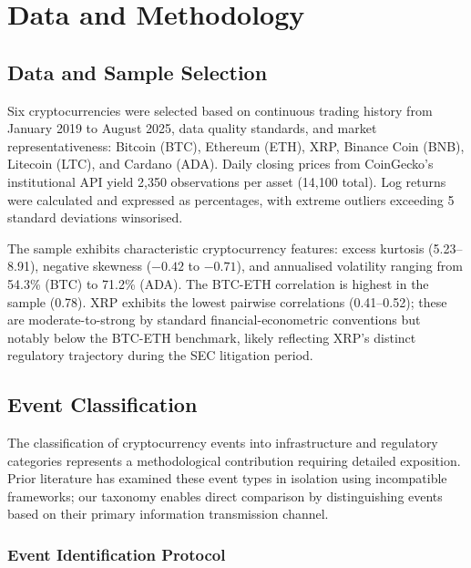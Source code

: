 \documentclass[pdflatex,sn-mathphys-num]{sn-jnl}
\theoremstyle{thmstyleone}
\theoremstyle{thmstyletwo}
\theoremstyle{thmstylethree}
\begin{document}

\section{Data and Methodology}\label{sec:methods}

\subsection{Data and Sample Selection}

Six cryptocurrencies were selected based on continuous trading history from January 2019 to August 2025, data quality standards, and market representativeness: Bitcoin (BTC), Ethereum (ETH), XRP, Binance Coin (BNB), Litecoin (LTC), and Cardano (ADA). Daily closing prices from CoinGecko's institutional API yield 2,350 observations per asset (14,100 total). Log returns were calculated and expressed as percentages, with extreme outliers exceeding 5 standard deviations winsorised.

The sample exhibits characteristic cryptocurrency features: excess kurtosis (5.23--8.91), negative skewness ($-0.42$ to $-0.71$), and annualised volatility ranging from 54.3\% (BTC) to 71.2\% (ADA). The BTC-ETH correlation is highest in the sample (0.78). XRP exhibits the lowest pairwise correlations (0.41--0.52); these are moderate-to-strong by standard financial-econometric conventions but notably below the BTC-ETH benchmark, likely reflecting XRP's distinct regulatory trajectory during the SEC litigation period.

\subsection{Event Classification}\label{sec:event_classification}

The classification of cryptocurrency events into infrastructure and regulatory categories represents a methodological contribution requiring detailed exposition. Prior literature has examined these event types in isolation using incompatible frameworks; our taxonomy enables direct comparison by distinguishing events based on their primary information transmission channel.

\subsubsection{Event Identification Protocol}
\end{document}
